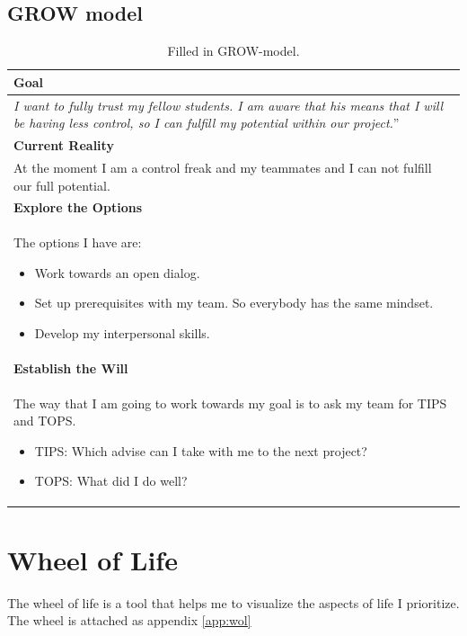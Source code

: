 \documentclass{article}
\begin{document}
\subsection{GROW model}
\begin{table}[!h]	
	\centering
	\caption{Filled in GROW-model.}
	\label{tab:GROW}
	\begin{tabular}[width=0.8\textwidth]{||p{\textwidth}||}
		\hline
		\textbf{Goal}\\\hline
		\textit{I want to fully trust my fellow students. I am aware that his means that I will be having less control, so I can fulfill my potential within our project.}''\\\hline
		\textbf{Current Reality}\\\hline
		At the moment I am a control freak and my teammates and I can not fulfill our full potential. \\\hline
		\textbf{Explore the Options}\\\hline
		The options I have are:
		\begin{itemize}
			\item Work towards an open dialog.
			\item Set up prerequisites with my team. So everybody has the same mindset.
			\item Develop my interpersonal skills. 
		\end{itemize}\\\hline
		\textbf{Establish the Will}\\\hline
		The way that I am going to work towards my goal is to ask my team for TIPS and TOPS.
		\begin{itemize}
			\item TIPS: Which advise can I take with me to the next project?
			\item TOPS: What did I do well?
		\end{itemize} \\\hline
	\end{tabular}
\end{table}
\newpage

\section{Wheel of Life}
The wheel of life is a tool that helps me to visualize the aspects of life I prioritize. The wheel is attached as appendix \ref{app:wol}
\end{document}
